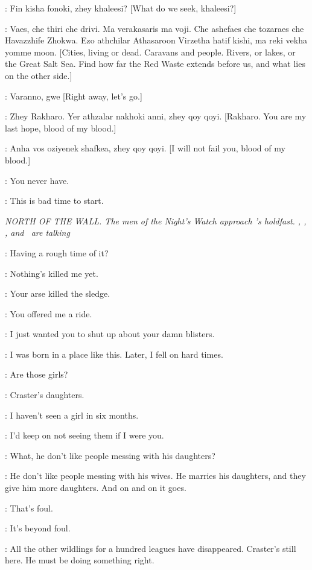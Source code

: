 \RAKHARO: Fin kisha fonoki, zhey khaleesi? [What do we seek, khaleesi?]

\DAENERYS: Vaes, che thiri che drivi. Ma verakasaris ma voji. Che ashefaes che tozaraes che Havazzhife Zhokwa. Ezo athchilar Athasaroon Virzetha hatif kishi, ma reki vekha yomme moon. [Cities, living or dead. Caravans and people. Rivers, or lakes, or the Great Salt Sea. Find how far the Red Waste extends before us, and what lies on the other side.]

\RAKHARO: Varanno, gwe [Right away, let's go.]

\DAENERYS: Zhey Rakharo. Yer athzalar nakhoki anni, zhey qoy qoyi. [Rakharo. You are my last hope, blood of my blood.]

\RAKHARO: Anha vos oziyenek shafkea, zhey qoy qoyi. [I will not fail you, blood of my blood.]

\DAENERYS: You never have.

\RAKHARO: This is bad time to start.


\scene

\textit{NORTH OF THE WALL. The men of the Night's Watch approach \CRASTER's holdfast.  \JON, \SAM, \GRENN, and \EDD ~are talking}

\JON: Having a rough time of it?

\SAM: Nothing's killed me yet.

\GRENN: Your arse killed the sledge.

\SAM: You offered me a ride.

\GRENN: I just wanted you to shut up about your damn blisters.

\EDD: I was born in a place like this. Later, I fell on hard times.

\SAM: Are those girls?

\EDD: Craster's daughters.

\SAM: I haven't seen a girl in six months.

\EDD: I'd keep on not seeing them if I were you.

\GRENN: What, he don't like people messing with his daughters?

\EDD: He don't like people messing with his wives. He marries his daughters, and they give him more daughters. And on and on it goes.

\SAM: That's foul.

\GRENN: It's beyond foul.

\EDD: All the other wildlings for a hundred leagues have disappeared. Craster's still here. He must be doing something right.

